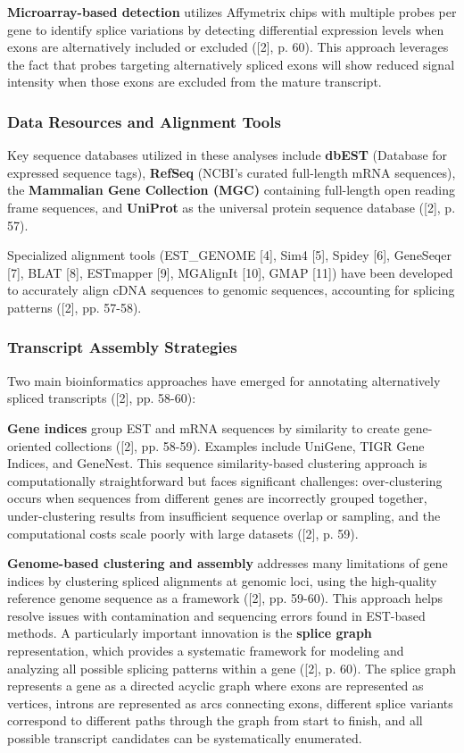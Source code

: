 \documentclass[12pt,a4paper]{article}
\begin{document}
\textbf{Microarray-based detection} utilizes Affymetrix chips with multiple probes per gene to identify splice variations by detecting differential expression levels when exons are alternatively included or excluded ([2], p. 60). This approach leverages the fact that probes targeting alternatively spliced exons will show reduced signal intensity when those exons are excluded from the mature transcript.

\subsubsection{Data Resources and Alignment Tools}

Key sequence databases utilized in these analyses include \textbf{dbEST} (Database for expressed sequence tags), \textbf{RefSeq} (NCBI's curated full-length mRNA sequences), the \textbf{Mammalian Gene Collection (MGC)} containing full-length open reading frame sequences, and \textbf{UniProt} as the universal protein sequence database ([2], p. 57).

Specialized alignment tools (EST\_GENOME [4], Sim4 [5], Spidey [6], GeneSeqer [7], BLAT [8], ESTmapper [9], MGAlignIt [10], GMAP [11]) have been developed to accurately align cDNA sequences to genomic sequences, accounting for splicing patterns ([2], pp. 57-58).

\subsubsection{Transcript Assembly Strategies}

Two main bioinformatics approaches have emerged for annotating alternatively spliced transcripts ([2], pp. 58-60):

\textbf{Gene indices} group EST and mRNA sequences by similarity to create gene-oriented collections ([2], pp. 58-59). Examples include UniGene, TIGR Gene Indices, and GeneNest. This sequence similarity-based clustering approach is computationally straightforward but faces significant challenges: over-clustering occurs when sequences from different genes are incorrectly grouped together, under-clustering results from insufficient sequence overlap or sampling, and the computational costs scale poorly with large datasets ([2], p. 59).

\textbf{Genome-based clustering and assembly} addresses many limitations of gene indices by clustering spliced alignments at genomic loci, using the high-quality reference genome sequence as a framework ([2], pp. 59-60). This approach helps resolve issues with contamination and sequencing errors found in EST-based methods. A particularly important innovation is the \textbf{splice graph} representation, which provides a systematic framework for modeling and analyzing all possible splicing patterns within a gene ([2], p. 60). The splice graph represents a gene as a directed acyclic graph where exons are represented as vertices, introns are represented as arcs connecting exons, different splice variants correspond to different paths through the graph from start to finish, and all possible transcript candidates can be systematically enumerated.
\end{document}
